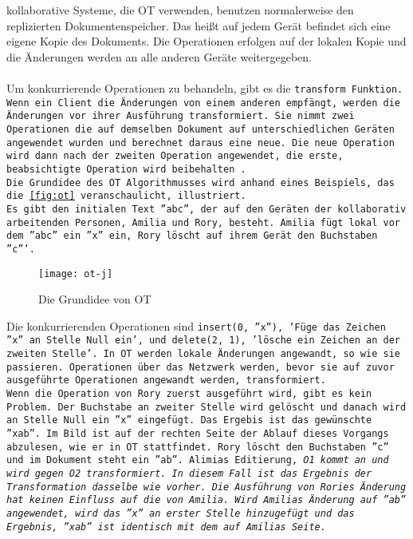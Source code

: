 %
\Gls{kollaborativ}e Systeme, die \gls{OT} verwenden, benutzen normalerweise den replizierten Dokumentenspeicher.
Das heißt auf jedem Gerät befindet sich eine eigene Kopie des Dokuments.
Die Operationen erfolgen auf der lokalen Kopie und die Änderungen werden an alle anderen Geräte weitergegeben.\\\\
%
Um konkurrierende Operationen zu behandeln, gibt es die \tt{transform} Funktion.
Wenn ein Client die Änderungen von einem anderen empfängt, werden die Änderungen vor ihrer Ausführung transformiert.
Sie nimmt zwei Operationen die auf demselben Dokument auf unterschiedlichen Geräten angewendet wurden und berechnet daraus eine neue.
Die neue Operation wird dann nach der zweiten Operation angewendet, die erste, beabsichtigte Operation wird beibehalten~\cite{ot_paper}.\\
%
Die Grundidee des \gls{OT} Algorithmusses wird anhand eines Beispiels, das die \autoref{fig:ot} veranschaulicht, illustriert.\\
Es gibt den initialen Text ''abc'', der auf den Geräten der kollaborativ arbeitenden Personen, Amilia und Rory, besteht.
Amilia fügt lokal vor dem ''abc'' ein ''x'' ein, Rory löscht auf ihrem Gerät den Buchstaben ''c'''.
%
\begin{figure}[h]
  \centering
  \texttt{[image: ot-j]}
  \grayRule
  \caption{Die Grundidee von \gls{OT}}
  \label{fig:ot}
\end{figure}
%
Die konkurrierenden Operationen sind \tt{insert(0, ''x'')}, 'Füge das Zeichen ''x'' an Stelle Null ein', und \tt{delete(2, 1)}, 'lösche ein Zeichen an der zweiten Stelle'.
In \gls{OT} werden lokale Änderungen angewandt, so wie sie passieren. Operationen über das Netzwerk werden, bevor sie auf zuvor ausgeführte Operationen angewandt werden, transformiert.\\
%
Wenn die Operation von Rory zuerst ausgeführt wird, gibt es kein Problem. Der Buchstabe an zweiter Stelle wird gelöscht und danach wird an Stelle Null ein ''x'' eingefügt. Das Ergebis ist das gewünschte ''xab''.
Im Bild ist auf der rechten Seite der Ablauf dieses Vorgangs abzulesen, wie er in \gls{OT} stattfindet. Rory löscht den Buchstaben ''c'' und im Dokument steht ein ''ab''. Alimias Editierung, \it{O1} kommt an und wird gegen \it{O2} transformiert. In diesem Fall ist das Ergebnis der Transformation dasselbe wie vorher. Die Ausführung von Rories Änderung hat keinen Einfluss auf die von Amilia. Wird Amilias Änderung auf ''ab'' angewendet, wird das ''x'' an erster Stelle hinzugefügt und das Ergebnis, ''xab'' ist identisch mit dem auf Amilias Seite.\\
